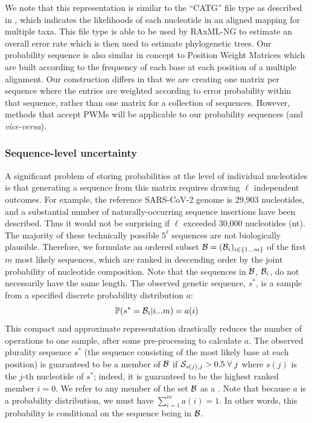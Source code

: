 \documentclass[10pt]{article}
\begin{document}
We note that this representation is similar to the ``CATG'' file type as described in \citet{kozlovModelsOptimizationsTools2018}, which indicates the likelihoods of each nucleotide in an aligned mapping for multiple taxa. 
This file type is able to be used by RAxML-NG to estimate an overall error rate which is then used to estimate phylogenetic trees.
Our probability sequence is also similar in concept to Position Weight Matrices \citep[PWMs, ][]{stormoUsePerceptronAlgorithm1982} which are built according to the frequency of each base at each position of a multiple alignment. 
Our construction differs in that we are creating one matrix per sequence where the entries are weighted according to error probability within that sequence, rather than one matrix for a collection of sequences. 
However, methods that accept PWMs will be applicable to our probability sequences (and \emph{vice-versa}).


\subsubsection{Sequence-level uncertainty}

A significant problem of storing probabilities at the level of individual nucleotides is that generating a sequence from this matrix requires drawing $\ell$ independent outcomes.
For example, the reference SARS-CoV-2 genome is 29,903 nucleotides, and a substantial number of naturally-occurring sequence insertions have been described.
Thus it would not be surprising if $\ell$ exceeded 30,000 nucleotides (nt).
The majority of these technically possible $5^\ell$ sequences are not biologically plausible.
Therefore, we formulate an ordered subset $\mathcal{B} = (\mathcal{B}_i)_{i\in\{1\ldots m\} }$ of the first $m$ most likely sequences, which are ranked in descending order by the joint probability of nucleotide composition.
Note that the sequences in $\mathcal{B}$, $\mathcal{B}_i$, do not necessarily have the same length.
The observed genetic sequence, $s^*$, is a sample from a specified discrete probability distribution $a$:
\begin{equation}
\mathbb{P}(s^* = \mathcal{B}_i | i ... m) = a(i)
\end{equation}
This compact and approximate representation drastically reduces the number of operations to one sample, after some pre-processing to calculate $a$.
The observed plurality sequence $s^*$ (the sequence consisting of the most likely base at each position) is guaranteed to be a member of $\mathcal{B}$ if $\mathcal{S}_{s(j), j} > 0.5\;\forall\;j$ where $s(j)$ is the $j$-th nucleotide of $s^*$; indeed, it is guaranteed to be the highest ranked member $i=0$.
We refer to any member of the set $\mathcal{B}$ as a \emph{\slps}.
Note that because $a$ is a probability distribution, we must have $\sum_{i=1}^m a(i) = 1$.
In other words, this probability is conditional on the sequence being in $\mathcal{B}$.
\end{document}
